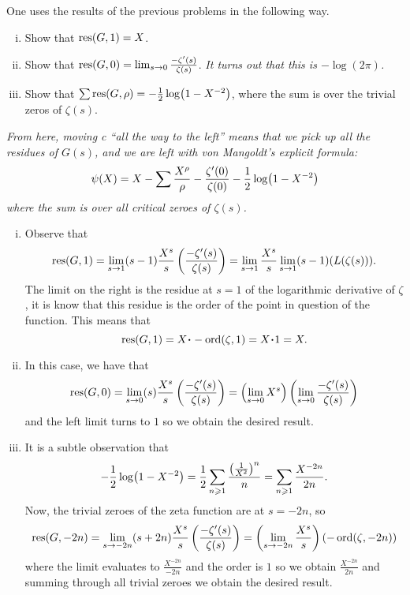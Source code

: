 \documentclass[12pt]{memoir}
\begin{document}
\begin{Ej}
    One uses the results of the previous problems in the following way.
    \begin{enumerate}[i)]
        \item Show that $\operatorname*{res}(G,1)=X$. 
        \item Show that $\operatorname*{res}(G,0)=\lim_{s\to 0}\frac{-\zeta'(s)}{\zeta(s)}$. \emph{It turns out that this is $-\log(2\pi)$.}
        \item Show that $\sum\operatorname*{res}(G,\rho)=-\frac{1}{2}\log(1-X^{-2})$, where the sum is over the trivial zeros of $\zeta(s)$.
    \end{enumerate}
    \emph{From here, moving c “all the way to the left” means that we pick up all the residues of $G(s)$, and we
    are left with von Mangoldt's explicit formula:}
    $$\psi(X)=X-\sum\frac{X^\rho}{\rho}-\frac{\zeta'(0)}{\zeta(0)}-\half\log(1-X^{-2})$$
    \emph{where the sum is over all critical zeroes of $\zeta(s)$.}
\end{Ej}

\begin{ptcbr}
    \begin{enumerate}[i)]
        \item Observe that 
        $$\operatorname*{res}(G,1)=\lim_{s\to 1}(s-1)\frac{X^s}{s}\left(\frac{-\zeta'(s)}{\zeta(s)}\right)=\lim_{s\to 1}\frac{X^s}{s}\lim_{s\to 1}(s-1)(L(\zeta(s))).$$
        The limit on the right is the residue at $s=1$ of the logarithmic derivative of $\zeta$, it is know that this residue is the order of the point in question of the function. This means that 
        $$\res(G,1)=X\.-\ord(\zeta,1)=X\.1=X.$$
        \item In this case, we have that 
        $$\operatorname*{res}(G,0)=\lim_{s\to 0}(s)\frac{X^s}{s}\left(\frac{-\zeta'(s)}{\zeta(s)}\right)=\left(\lim_{s\to 0}X^s\right)\left(\lim_{s\to 0}\frac{-\zeta'(s)}{\zeta(s)}\right)$$
        and the left limit turns to $1$ so we obtain the desired result.
        \item It is a subtle observation that 
        $$-\half\log(1-X^{-2})=\half\sum_{n\geq 1}\frac{\left(\frac
        {1}{X^2}\right)^n}{n}=\sum_{n\geq 1}\frac{X^{-2n}}{2n}.$$
        Now, the trivial zeroes of the zeta function are at $s=-2n$, so 
        $$\operatorname*{res}(G,-2n)=\lim_{s\to-2n}(s+2n)\frac{X^s}{s}\left(\frac{-\zeta'(s)}{\zeta(s)}\right)=\left(\lim_{s\to-2n}\frac{X^s}{s}\right)(-\operatorname{ord}(\zeta,-2n))$$
        where the limit evaluates to $\frac{X^{-2n}}{-2n}$ and the order is $1$ so we obtain $\frac{X^{-2n}}{2n}$ and summing through all trivial zeroes we obtain the desired result.
    \end{enumerate}
\end{ptcbr}
\end{document}
